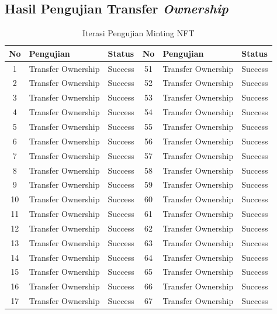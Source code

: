 \subsection{Hasil Pengujian Transfer \emph{Ownership}}
\label{sec:pengujian_ketiga}
\begin{longtable}[c]{|c|l|l||c|l|l|}
  \caption{Iterasi Pengujian Minting NFT}
  \label{tab:iterasi_pengujian_transfer}\\
  \hline
  \textbf{No} & \textbf{Pengujian} & \textbf{Status} & \textbf{No} & \textbf{Pengujian} & \textbf{Status} \\ \hline
  \endfirsthead
  \endhead
  1  & Transfer Ownership & Success & 51 & Transfer Ownership & Success \\ \hline
  2  & Transfer Ownership & Success & 52 & Transfer Ownership & Success \\ \hline
  3  & Transfer Ownership & Success & 53 & Transfer Ownership & Success \\ \hline
  4  & Transfer Ownership & Success & 54 & Transfer Ownership & Success \\ \hline
  5  & Transfer Ownership & Success & 55 & Transfer Ownership & Success \\ \hline
  6  & Transfer Ownership & Success & 56 & Transfer Ownership & Success \\ \hline
  7  & Transfer Ownership & Success & 57 & Transfer Ownership & Success \\ \hline
  8  & Transfer Ownership & Success & 58 & Transfer Ownership & Success \\ \hline
  9  & Transfer Ownership & Success & 59 & Transfer Ownership & Success \\ \hline
  10 & Transfer Ownership & Success & 60 & Transfer Ownership & Success \\ \hline
  11 & Transfer Ownership & Success & 61 & Transfer Ownership & Success \\ \hline
  12 & Transfer Ownership & Success & 62 & Transfer Ownership & Success \\ \hline
  13 & Transfer Ownership & Success & 63 & Transfer Ownership & Success \\ \hline
  14 & Transfer Ownership & Success & 64 & Transfer Ownership & Success \\ \hline
  15 & Transfer Ownership & Success & 65 & Transfer Ownership & Success \\ \hline
  16 & Transfer Ownership & Success & 66 & Transfer Ownership & Success \\ \hline
  17 & Transfer Ownership & Success & 67 & Transfer Ownership & Success \\ \hline

\end{longtable}
